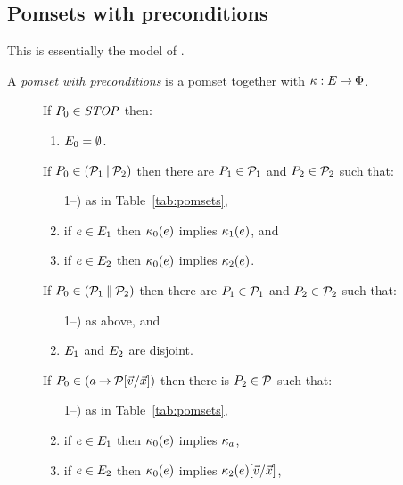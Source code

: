 \subsection{Pomsets with preconditions}

This is essentially the model of \cite{10.1145/3428262}.

\begin{definition}
  A \emph{pomset with preconditions} is
  a pomset together with $\kappa:E\mathbin\rightarrow\Phi$.
\end{definition}

\begin{figure*}
  If $P_0\in\mathit{STOP}$ then:
  \begin{enumerate}
    \item $E_0 = \emptyset$.
  \end{enumerate}
  If $P_0 \in (\mathcal{P}_1\mathbin{\mid}\mathcal{P}_2)$ then
  there are $P_1\in\mathcal{P}_1$ and $P_2\in\mathcal{P}_2$ such that:
  \begin{enumerate}
     \setcounter{enumi}{\value{pomsetParCount}}
  \item[1--\thepomsetParCount)] as in Table~\ref{tab:pomsets},
  \item if $e\in E_1$ then $\kappa_0(e)$ implies $\kappa_1(e)$, and
  \item if $e\in E_2$ then $\kappa_0(e)$ implies $\kappa_2(e)$.
    \setcounter{pomsetPreParCount}{\value{enumi}}
  \end{enumerate}
  If $P_0 \in (\mathcal{P}_1\mathbin{\parallel}\mathcal{P}_2)$ then
  there are $P_1\in\mathcal{P}_1$ and $P_2\in\mathcal{P}_2$ such that:
  \begin{enumerate}
  \setcounter{enumi}{\value{pomsetPreParCount}}
  \item[1--\thepomsetPreParCount)] as above, and
  \item $E_1$ and $E_2$ are disjoint.
  \end{enumerate}
  If $P_0 \in (a\mathbin{\rightarrow}\mathcal{P}[\vec{v}/\vec{x}])$ then there is $P_2\in\mathcal{P}$ such that:
  \begin{enumerate}
     \setcounter{enumi}{\value{pomsetPrefixCount}}
  \item[1--\thepomsetPrefixCount)] as in Table~\ref{tab:pomsets},
  \item if $e\in E_1$ then $\kappa_0(e)$ implies $\kappa_a$,
  \item if $e\in E_2$ then $\kappa_0(e)$ implies $\kappa_2(e)[\vec{v}/\vec{x}]$,

\end{enumerate}
\end{figure*}
